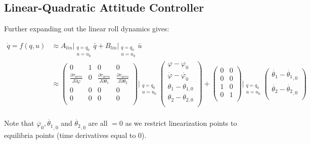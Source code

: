 \documentclass[12pt]{article}
\begin{document}
\bigskip\bigskip\bigskip\bigskip
\subsection*{Linear-Quadratic Attitude Controller}

Further expanding out the linear roll dynamics gives:

\begin{align*}
\dot{q} = f(q, u) &\approx A_{lin}\Big|_{\substack{q = q_0\\u = u_0}} \bar{q} + B_{lin}\Big|_{\substack{q = q_0\\u = u_0}} \bar{u} \\
&\approx \begin{pmatrix}
0 & 1 & 0 & 0 \\
\frac{\partial \tau_{aero}}{J \partial \varphi} & 0 & \frac{\partial \tau_{aero}}{J \partial \theta_1} & \frac{\partial \tau_{aero}}{J \partial \theta_2} \\
0 & 0 & 0 & 0 \\
0 & 0 & 0 & 0 \\
\end{pmatrix}\Bigg|_{\substack{q = q_0\\u = u_0}}
\begin{pmatrix}
\varphi - \varphi_0 \\
\dot{\varphi} - \dot{\varphi_0} \\
\theta_1 - \theta_{1, 0} \\
\theta_2 - \theta_{2, 0} \\
\end{pmatrix} +
\begin{pmatrix}
0 & 0 \\
0 & 0 \\
1 & 0 \\
0 & 1 \\
\end{pmatrix}\Bigg|_{\substack{q = q_0\\u = u_0}}
\begin{pmatrix}
\dot{\theta_1} -  \dot{\theta_{1}}_{,0} \\
\dot{\theta_2} -  \dot{\theta_{2}}_{,0} \\
\end{pmatrix}
\end{align*} \\

Note that $\dot{\varphi_0}, \dot{\theta_{1}}_{,0}$ and $\dot{\theta_{2}}_{,0}$ are all $ = 0$ as we restrict linearization points to equilibria points (time derivatives equal to 0). \\
\end{document}
